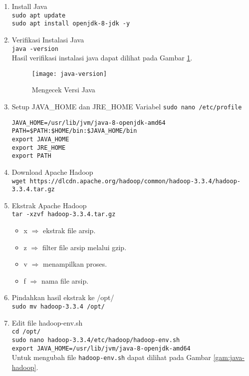 \documentclass[a4paper]{tufte-handout}
\begin{document}
\begin{enumerate}
\item Install Java \\
{\tt sudo apt update} \\
{\tt sudo apt install openjdk-8-jdk -y} \\

\item Verifikasi Instalasi Java \\
{\tt java -version} \\
Hasil verifikasi  instalasi java dapat dilihat pada Gambar \ref{gam:java-version}.
\begin{figure}
\texttt{[image: java-version]}
\caption{Mengecek Versi Java}
\label{gam:java-version}
\end{figure}

\item Setup JAVA\_HOME dan JRE\_HOME Variabel
{\tt sudo nano /etc/profile} \\
\begin{lstlisting}
JAVA_HOME=/usr/lib/jvm/java-8-openjdk-amd64
PATH=$PATH:$HOME/bin:$JAVA_HOME/bin
export JAVA_HOME
export JRE_HOME
export PATH
\end{lstlisting}

\item Download Apache Hadoop \\
{\tt wget https://dlcdn.apache.org/hadoop/common/hadoop-3.3.4/hadoop-3.3.4.tar.gz}

\item Ekstrak Apache Hadoop \\
{\tt tar -xzvf hadoop-3.3.4.tar.gz }
\begin{itemize}
\item x $\Rightarrow$ ekstrak file arsip.
\item z $\Rightarrow$ filter file arsip melalui gzip.
\item v $\Rightarrow$ menampilkan proses.
\item f $\Rightarrow$ nama file arsip.
\end{itemize}

\item Pindahkan hasil ekstrak ke /opt/ \\
{\tt sudo mv hadoop-3.3.4 /opt/}

\item Edit file hadoop-env.sh \\
{\tt cd /opt/} \\
{\tt sudo nano hadoop-3.3.4/etc/hadoop/hadoop-env.sh} \\
{\tt export JAVA\_HOME=/usr/lib/jvm/java-8-openjdk-amd64} \\
Untuk mengubah file {\tt hadoop-env.sh} dapat dilihat pada Gambar \ref{gam:java-hadoop}.


\end{enumerate}
\end{document}
